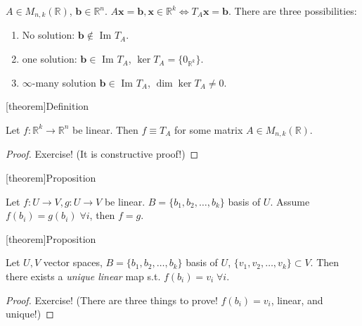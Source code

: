 \documentclass[12pt]{report}
\theoremstyle{definition}
\begin{document}
\begin{ex}
    $A \in M_{n,k}(\mathbb{R})$, $\mathbf{b}\in \mathbb{R}^{n}$.
    $A\mathbf{x} =\mathbf{b}, \mathbf{x} \in \mathbb{R}^{k} \iff T_A \mathbf{x} =\mathbf{b}$.
    There are three possibilities:
    \begin{enumerate}[label = (\arabic*)]
        \item No solution: $\mathbf{b}\notin $ Im $T_A$.
        \item one solution: $\mathbf{b}\in$ Im $T_A$, $\ker{T_A} = \{0_{\mathbb{R}^{k}}\}$.
        \item $\infty$-many solution $\mathbf{b}\in$ Im $T_A$, $\dim{\ker{T_A}} \neq 0$.
    \end{enumerate}
\end{ex}

[theorem]{Definition}
\begin{linear map has a matrix representation}
    Let $f:\mathbb{R}^{k} \rightarrow{} \mathbb{R}^{n}$ be linear.
    Then $f \equiv T_A$ for some matrix $A \in M_{n,k}(\mathbb{R})$.
\end{linear map has a matrix representation}

\begin{proof}
   Exercise! (It is constructive proof!)
\end{proof}

[theorem]{Proposition}
\begin{same basis tranformed implies same linear map}
    Let $f:U\rightarrow{}V, g:U\rightarrow{}V$ be linear.
    $B = \{b_1, b_2,\ldots,b_k\}$ basis of $U$.
    Assume $f(b_i) = g(b_i) \;\forall i$, then $f = g$.
\end{same basis tranformed implies same linear map}

[theorem]{Proposition}
\begin{unique linear map from U to V}
    Let $U,V$ vector spaces, $B = \{b_1, b_2,\ldots,b_k\}$ basis of $U$,
    $\{v_1, v_2,\ldots,v_k\} \subset V$.
    Then there exists a \emph{unique linear} map s.t. $f(b_i) = v_i \;\forall i$.
\end{unique linear map from U to V}

\begin{proof}
    Exercise! (There are three things to prove! $f(b_i) = v_i$, linear, and unique!)
\end{proof}
\end{document}
